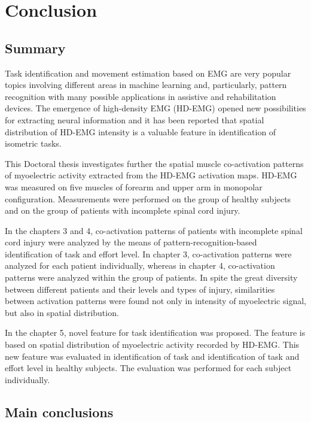 \chapter{Conclusion}
\label{ch:conclusions}

\section{Summary}

Task identification and movement estimation based on EMG are very popular topics involving different areas in machine learning and, particularly, pattern recognition with many possible applications in assistive and rehabilitation devices. The emergence of high-density EMG (HD-EMG) opened new possibilities for extracting neural information and it has been reported that spatial distribution of HD-EMG intensity is a valuable feature in identification of isometric tasks.

This Doctoral thesis investigates further the spatial muscle co-activation patterns of myoelectric activity extracted from the HD-EMG activation maps. HD-EMG was measured on five muscles of forearm and upper arm in monopolar configuration. Measurements were performed on the group of healthy subjects and on the group of patients with incomplete spinal cord injury.

In the chapters 3 and 4, co-activation patterns of patients with incomplete spinal cord injury were analyzed by the means of pattern-recognition-based identification of task and effort level. In chapter 3, co-activation patterns were analyzed for each patient individually, whereas in chapter 4, co-activation patterns were analyzed within the group of patients. In spite the great diversity between different patients and their levels and types of injury, similarities between activation patterns were found not only in intensity of myoelectric signal, but also in spatial distribution.

In the chapter 5, novel feature for task identification was proposed. The feature is based on spatial distribution of myoelectric activity recorded by HD-EMG. This new feature was evaluated in identification of task and identification of task and effort level in healthy subjects. The evaluation was performed for each subject individually. 


\section{Main conclusions}


